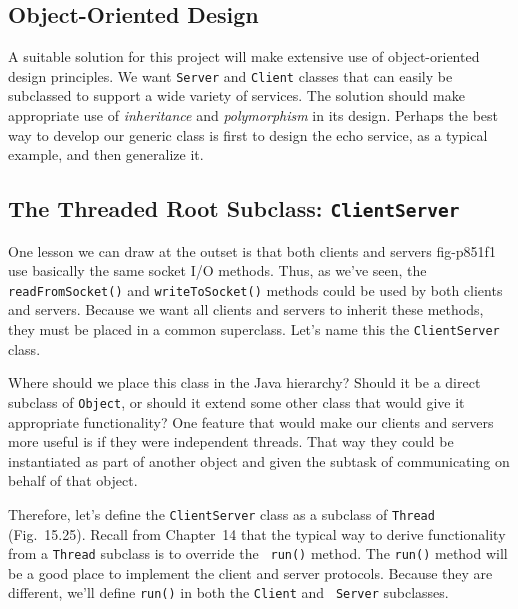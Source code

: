 {\subsection{Object-Oriented Design}
\noindent A suitable solution for this project will make extensive use of
object-oriented design principles.  We want {\tt Server} and
{\tt Client} classes that can easily be subclassed to support a wide
variety of services.  The solution should make appropriate use of {\it
inheritance} and {\it polymorphism} in its design.  Perhaps the best
way to develop our generic class is first to design the echo service,
as a typical example, and then generalize it.

\subsection*{The Threaded Root Subclass: {\tt ClientServer} }
\noindent One lesson we can draw at the outset is that both clients and servers
{fig-p851f1}
use basically the same socket I/O methods.  Thus, as we've seen, the
{\tt readFromSocket()} and {\tt writeToSocket()} methods could be used
by both clients and servers.  Because we want all clients and servers to
inherit these methods, they must be placed in a common
superclass.  Let's name this the {\tt ClientServer} class.


Where should we place this class in the Java hierarchy? Should it be a
direct subclass of {\tt Object}, or should it extend some other class
that would give it appropriate functionality?  One feature that would
make our clients and servers more useful is if they were independent
threads.  That way they could be instantiated as part of another object
and given the subtask of communicating on behalf of that object. 

Therefore, let's define the {\tt ClientServer} class as a subclass of
{\tt Thread} (Fig.~15.25). Recall from
Chapter~14 that the typical way to derive
functionality from a {\tt Thread} subclass is to override the {\tt
run()} method.  The {\tt run()} method will be a good place to
implement the client and server protocols.  Because they are
different, we'll define {\tt run()} in both the {\tt Client} and {\tt
Server} subclasses.

}
